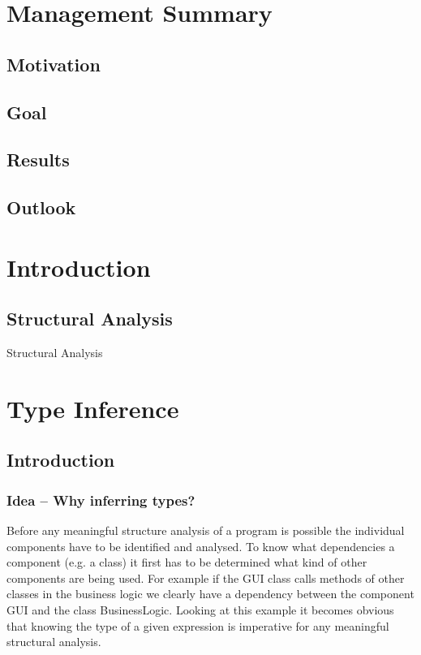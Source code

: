 \documentclass[12pt,halfparskip]{scrreprt}
\begin{document}
\chapter*{Management Summary}

\section*{Motivation}

\section*{Goal}

\section*{Results}

\section*{Outlook}


\newpage

\tableofcontents

\newpage
{}
\pagestyle{scrheadings}

\chapter{Introduction}

\section{Structural Analysis}

Structural Analysis

\chapter{Type Inference}

\section{Introduction}

\subsection{Idea – Why inferring types?}
Before any meaningful structure analysis of a program is possible the individual components have to be identified and analysed. To know what dependencies a component (e.g. a class) it first has to be determined what kind of other components are being used. For example if the GUI class calls methods of other classes in the business logic we clearly have a dependency between the component GUI and the class BusinessLogic. Looking at this example it becomes obvious that knowing the type of a given expression is imperative for any meaningful structural analysis.
\end{document}

